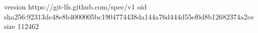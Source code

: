 version https://git-lfs.github.com/spec/v1
oid sha256:92313de48e8b4000005bc1904774438da144a76d444d55ef0d8b12682374a2ce
size 112462
